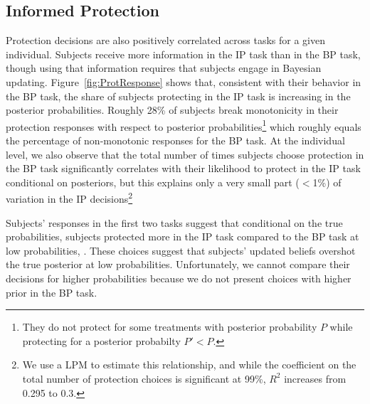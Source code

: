 \subsection{Informed Protection}
Protection decisions are also positively correlated across tasks for a given individual.
Subjects receive more information in the IP task than in the BP task, though using that information requires that subjects engage in Bayesian updating.  Figure~\ref{fig:ProtResponse} shows that, consistent with their behavior in the BP task, the share of subjects protecting in the IP task is increasing in the posterior probabilities. Roughly 28\% of subjects break monotonicity in their protection responses with respect to posterior probabilities\footnote{ They do not protect for some treatments with posterior probability $P$ while protecting for a posterior probabilty $P'<P$.} which roughly equals the percentage of non-monotonic responses for the BP task. At the individual level, we also observe that the total number of times subjects choose protection in the BP task significantly correlates with their likelihood to protect in the IP task conditional on posteriors, but this explains only a very small part ($<$1\%) of variation in the IP decisions\footnote{We use a LPM to estimate this relationship, and while the coefficient on the total number of protection choices is significant at 99\%, $R^2$ increases from 0.295 to 0.3.} 

Subjects' responses in the first two tasks suggest that conditional on the true probabilities, subjects protected more in the IP task compared to the BP task at low probabilities, . These choices suggest that subjects' updated beliefs overshot the true posterior at low probabilities.  Unfortunately, we cannot compare their decisions for higher probabilities because we do not present choices with higher prior in the BP task.


